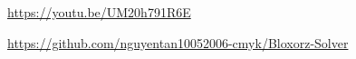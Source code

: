 \newcommand{\classname}{}
\newcommand{\lecturer}{}

\urldef{\videourl}\url{https://youtu.be/UM20h791R6E}

\urldef{\githuburl}\url{https://github.com/nguyentan10052006-cmyk/Bloxorz-Solver}
